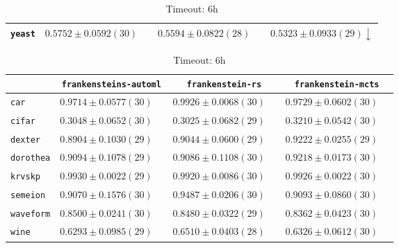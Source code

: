 \begin{table}[ht]
\begin{subtable}{\textwidth}
\begin{tabular}{l|ccc}
            \texttt{yeast} & $ \boldsymbol{0.5752} \pm 0.0592 (30) \phantom{\downarrow}$ & $ 0.5594 \pm 0.0822 (28) \phantom{\downarrow}$ & $ 0.5323 \pm 0.0933 (29) \downarrow$\\
            \hline
        \end{tabular}
    \end{subtable}
    \par\bigskip
    \begin{subtable}{\textwidth}
        \centering
        \caption{Timeout: 6h}
        \begin{tabular}{l|ccc}
            & \texttt{frankensteins-automl}  & \texttt{frankenstein-rs}  & \texttt{frankenstein-mcts} \\
            \hline
            \texttt{car} & $ 0.9714 \pm 0.0577 (30) \phantom{\downarrow}$ & $ \boldsymbol{0.9926} \pm 0.0068 (30) \phantom{\downarrow}$ & $ 0.9729 \pm 0.0602 (30) \phantom{\downarrow}$\\
            \texttt{cifar} & $ 0.3048 \pm 0.0652 (30) \phantom{\downarrow}$ & $ 0.3025 \pm 0.0682 (29) \phantom{\downarrow}$ & $ \boldsymbol{0.3210} \pm 0.0542 (30) \phantom{\downarrow}$\\
            \texttt{dexter} & $ 0.8904 \pm 0.1030 (29) \phantom{\downarrow}$ & $ 0.9044 \pm 0.0600 (29) \phantom{\downarrow}$ & $ \boldsymbol{0.9222} \pm 0.0255 (29) \phantom{\downarrow}$\\
            \texttt{dorothea} & $ 0.9094 \pm 0.1078 (29) \phantom{\downarrow}$ & $ 0.9086 \pm 0.1108 (30) \phantom{\downarrow}$ & $ \boldsymbol{0.9218} \pm 0.0173 (30) \phantom{\downarrow}$\\
            \texttt{krvskp} & $ \boldsymbol{0.9930} \pm 0.0022 (29) \phantom{\downarrow}$ & $ 0.9920 \pm 0.0086 (30) \phantom{\downarrow}$ & $ 0.9926 \pm 0.0022 (30) \phantom{\downarrow}$\\
            \texttt{semeion} & $ 0.9070 \pm 0.1576 (30) \phantom{\downarrow}$ & $ \boldsymbol{0.9487} \pm 0.0206 (30) \phantom{\downarrow}$ & $ 0.9093 \pm 0.0860 (30) \phantom{\downarrow}$\\
            \texttt{waveform} & $ \boldsymbol{0.8500} \pm 0.0241 (30) \phantom{\downarrow}$ & $ 0.8480 \pm 0.0322 (29) \phantom{\downarrow}$ & $ 0.8362 \pm 0.0423 (30) \phantom{\downarrow}$\\
            \texttt{wine} & $ 0.6293 \pm 0.0985 (29) \phantom{\downarrow}$ & $ \boldsymbol{0.6510} \pm 0.0403 (28) \phantom{\downarrow}$ & $ 0.6326 \pm 0.0612 (30) \phantom{\downarrow}$\\

\end{tabular}
\end{subtable}
\end{table}
